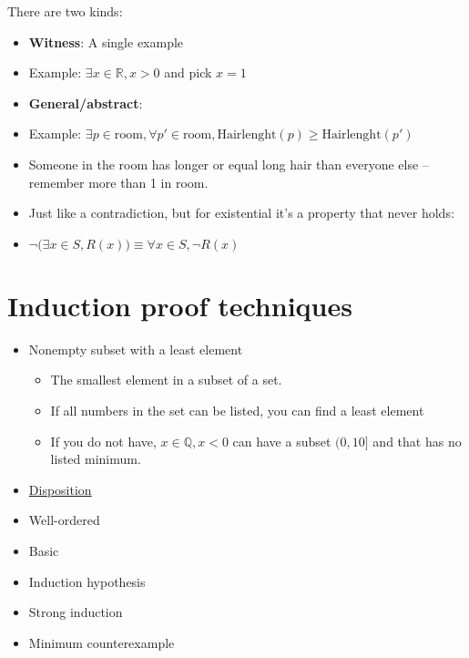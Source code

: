 \documentclass[english,10pt,a4paper]{article}
\begin{document}
\begin{theo} 
 There are two kinds:
\begin{itemize}
\item \textbf{Witness}: A single example
\item[] Example: $\exists x \in \mathbb{R}, x > 0$ and pick $x=1$
\item \textbf{General/abstract}: 
\item[] Example: $\exists p \in \text{room}, \forall p' \in \text{room}, \text{Hairlenght}(p) \geq \text{Hairlenght}(p')$
\item[] Someone in the room has longer or equal long hair than everyone else -- remember more than 1 in room.
\end{itemize}
\end{theo}


\begin{theo} 
\begin{itemize}
\item Just like a contradiction, but for existential it's a property that never holds:
\item $\neg \big(\exists x \in S, R(x)\big) \equiv \forall x \in S, \neg R(x)$
\end{itemize}
\end{theo}



\newpage
\section{Induction proof techniques}


\begin{minipage}{0.70\linewidth}
\begin{theo} 
\begin{itemize}
\item Nonempty subset with a least element
\begin{itemize}
\item The smallest element in a subset of a set.
\item If all numbers in the set can be listed, you can find a least element
\item If you do not have, $x \in \mathbb{Q}, x < 0$ can have a subset $(0, 10]$ and that has no listed minimum.

\end{itemize}
\end{itemize}
\end{theo}
\end{minipage}
\hspace{0.1cm}
\begin{minipage}{0.25\linewidth}
\begin{itemize}
\item[] \underline{Disposition}
\item Well-ordered
\item Basic
\item Induction hypothesis
\item Strong induction
\item Minimum counterexample
\end{itemize}
\end{minipage}
\end{document}
